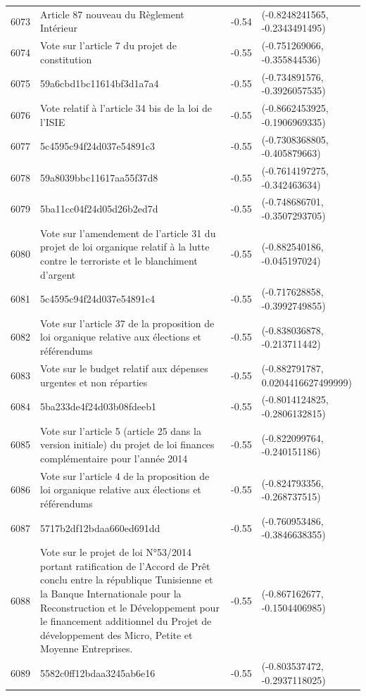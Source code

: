 \begin{table}[ht]
\begin{tabular}{rlrl}
  6073 & Article 87 nouveau du Règlement Intérieur & -0.54 & (-0.8248241565, -0.2343491495) \\ 
  6074 & Vote sur l'article 7 du projet de constitution & -0.55 & (-0.751269066, -0.355844536) \\ 
  6075 & 59a6cbd1bc11614bf3d1a7a4 & -0.55 & (-0.734891576, -0.3926057535) \\ 
  6076 & Vote relatif à l'article 34 bis de la loi de l'ISIE & -0.55 & (-0.8662453925, -0.1906969335) \\ 
  6077 & 5c4595c94f24d037e54891c3 & -0.55 & (-0.7308368805, -0.405879663) \\ 
  6078 & 59a8039bbc11617aa55f37d8 & -0.55 & (-0.7614197275, -0.342463634) \\ 
  6079 & 5ba11cc04f24d05d26b2ed7d & -0.55 & (-0.748686701, -0.3507293705) \\ 
  6080 & Vote sur l'amendement de l'article 31 du projet de loi organique relatif à la lutte contre le terroriste et le blanchiment d'argent & -0.55 & (-0.882540186, -0.045197024) \\ 
  6081 & 5c4595c94f24d037e54891c4 & -0.55 & (-0.717628858, -0.3992749855) \\ 
  6082 & Vote sur l'article 37 de la proposition de loi organique relative aux élections et référendums & -0.55 & (-0.838036878, -0.213711442) \\ 
  6083 & Vote sur le budget relatif aux dépenses urgentes et non réparties & -0.55 & (-0.882791787, 0.0204416627499999) \\ 
  6084 & 5ba233de4f24d03b08fdeeb1 & -0.55 & (-0.8014124825, -0.2806132815) \\ 
  6085 & Vote sur l'article 5 (article 25 dans la version initiale) du projet de loi finances complémentaire pour l'année 2014 & -0.55 & (-0.822099764, -0.240151186) \\ 
  6086 & Vote sur l'article 4 de la proposition de loi organique relative aux élections et référendums & -0.55 & (-0.824793356, -0.268737515) \\ 
  6087 & 5717b2df12bdaa660ed691dd & -0.55 & (-0.760953486, -0.3846638355) \\ 
  6088 & Vote sur le projet de loi N°53/2014 portant ratification de l’Accord de Prêt conclu entre la république Tunisienne et la Banque Internationale pour la Reconstruction et le Développement pour le financement additionnel du Projet de développement des Micro, Petite et Moyenne Entreprises. & -0.55 & (-0.867162677, -0.1504406985) \\ 
  6089 & 5582c0ff12bdaa3245ab6e16 & -0.55 & (-0.803537472, -0.2937118025) \\ 

\end{tabular}
\end{table}
